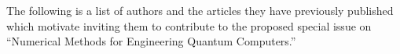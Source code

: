\documentclass[]{article}
\begin{document}

The following is a list of authors and the articles they
have previously published which motivate inviting them to 
contribute to the proposed special issue on ``Numerical Methods for Engineering Quantum Computers.''
\end{document}
